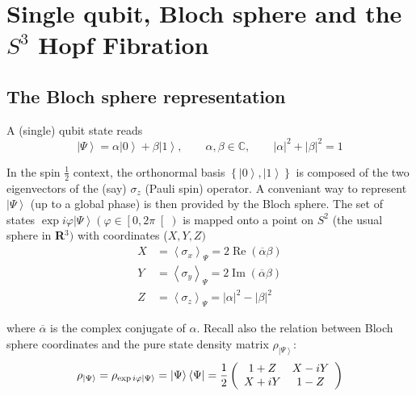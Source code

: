 \documentclass{amsart}
\begin{document}
\bigskip

\section{ Single qubit, Bloch sphere and the $S^{3}$ Hopf Fibration}

\subsection{The Bloch sphere representation}

A (single) qubit state reads
\begin{equation}
\left|  \Psi\right\rangle =\alpha\left|  0\right\rangle +\beta\left|
1\right\rangle ,\qquad\alpha,\beta\in\mathbb{C}\mathbf{,\qquad}\left|
\alpha\right|  ^{2}+\left|  \beta\right|  ^{2}=1 \label{one-qbit state}%
\end{equation}

In the spin
${\frac12}$%
context, the orthonormal basis $\left\{  \left|  0\right\rangle ,\left|
1\right\rangle \right\}  $ is composed of the two eigenvectors of the (say)
$\sigma_{z}$ (Pauli spin) operator. A conveniant way to represent $\left|
\Psi\right\rangle $ (up to a global phase) is then provided by the Bloch
sphere. The set of states $\exp i\varphi\left|  \Psi\right\rangle (\varphi
\in\left[  0,2\pi\right[  )$ is mapped onto a point on $S^{2}$ (the usual
sphere in \textbf{R}$^{3})$ with coordinates ($X,Y,Z)$%
\begin{align}
X &  =\left\langle \sigma_{x}\right\rangle _{\Psi}=2\operatorname{Re}%
(\overline{\alpha}\beta)\\
Y &  =\left\langle \sigma_{y}\right\rangle _{\Psi}=2\operatorname{Im}%
(\overline{\alpha}\beta)\nonumber\\
Z &  =\left\langle \sigma_{z}\right\rangle _{\Psi}=\left|  \alpha\right|
^{2}-\left|  \beta\right|  ^{2}\nonumber
\end{align}

where $\overline{\alpha}$ is the complex conjugate of $\alpha$. Recall also
the relation between Bloch sphere coordinates and the pure state density
matrix $\rho_{\left|  \Psi\right\rangle }$:
\begin{equation}
\rho_{\left|  \Psi\right\rangle }=\rho_{\exp i\varphi\left|  \Psi\right\rangle
}=\left|  \Psi\right\rangle \left\langle \Psi\right|  =\frac{1}{2}\left(
\begin{array}
[c]{cc}%
1+Z & X-iY\\
X+iY & 1-Z
\end{array}
\right)
\end{equation}
\end{document}
